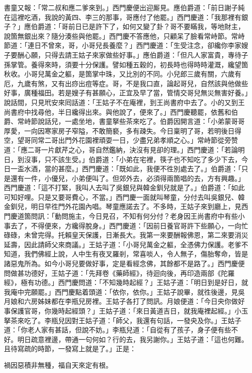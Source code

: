書童又報：「常二叔和應二爹來到。」西門慶便出迎厮見。應伯爵道：「前日謝子純在這裡吃酒，我說的黃四、李三的那事，哥應付了他罷。」西門慶道：「我那裡有銀子？」應伯爵道：「哥前日已是許下了，如何又變了卦？哥不要瞞我，等地財主，說箇無銀出來？隨分湊些與他罷。」西門慶不答應他，只顧呆了臉看常峙節。{}常峙節道：「連日不曾來，哥，小哥兒長養麼？」西門慶道：「生受注念，卻纔你李家嫂子要酬心願，只得去請王姑子來家做些好事。」應伯爵道：「但凡人家富貴，專待子孫掌管。養得來時，須要十分保護。譬如種五穀的，初長時也得時時灌溉，纔望箇秋收。小哥兒萬金之軀，是箇掌中珠，又比別的不同。小兒郎三歲有關，六歲有厄，九歲有煞，又有出痧出痘等症。哥，不是我口直，論起哥兒，自然該與他做些好事，廣種福田。若是嫂子有甚願心，正宜及早了當，管情交哥兒無災無害好養。」說話間，只見玳安來囘話道：「王姑子不在庵裡，到王尚書府中去了。小的又到王尚書府中找尋他，半日纔得出來。與他說了，便來了。」西門慶聽罷，依舊和伯爵、常峙節說話兒，一處坐地，書童拏些茶來吃了。伯爵因開言道：「小弟蒙哥哥厚愛，一向因寒家房子窄隘，不敢簡褻，多有疎失。今日稟明了哥，若明後日得空，望哥同常二哥出門外花園裡頑耍一日，少盡兄弟孝順之心。」常峙節從旁赞道：「應二哥一片獻芹之心，哥自然鑑納，決沒有見卻的理。」西門慶道：「若論明日，到沒事，只不該生受。」伯爵道：「小弟在宅裡，筷子也不知吃了多少下去，{}今日一盃水酒，當的甚麼。」西門慶道：「既如此，我便不徃別處去了。」伯爵道：「只是還有一件，小優兒，小弟便叫了。但郊外去，必須得兩箇唱的去，方有興趣。」西門慶道：「這不打緊，我叫人去叫了吳銀兒與韓金釧兒就是了。」伯爵道：「如此可知好哩。只是又要哥費心，不當。」西門慶一面就叫琴童，分付去叫吳銀兒、韓金釧兒，明日早徃門外花園內唱。琴童應諾去了。不多時，王姑子來到廳上，見西門慶道箇問訊：「動問施主，今日見召，不知有何分付？老身因王尚書府中有些小事去了，不得便來，方纔得脫身。」西門慶道：「因前日養官哥許下些願心，一向忙碌碌，未曾完得。托賴皇天保護，日漸長大。我第一來要酬報佛恩，第二來要消災延壽，因此請師父來商議。」王姑子道：「小哥兒萬金之軀，全憑佛力保護。老爹不知道，我們佛經上說，人中生有夜叉羅剎，常喜啖人，令人無子，傷胎奪命，皆是諸惡鬼所為。{}如今小哥兒要做好事，定是看經念佛，其餘都不是路了。」西門慶便問做甚功德好，王姑子道：「先拜卷《藥師經》，待迴向後，再印造兩部《陀羅經》，極有功德。」西門慶問道：「不知幾時起經？」王姑子道：「明日到是好日，就我庵中完願罷。」西門慶點着頭道：「依你，依你。」王姑子說畢，就徃後邊，見吳月娘和六房姊妹都在李瓶兒房裡。王姑子各打了問訊。月娘便道：「今日央你做好事保護官哥，你幾時起經頭？」王姑子道：「來日黃道吉日，就我庵裡起經。」小玉拏茶來吃了。李瓶兒因對王姑子道：「師父，我還有句話，一發央及你。」王姑子道：「你老人家有甚話，但說不妨。」李瓶兒道：「自從有了孩子，身子便有些不好。明日疏意裡邊，帶通一句何如？行的去，我另謝你。」王姑子道：「這也何難。且待寫疏的時節，一發寫上就是了。」正是：

\begin{myquote}
禍因惡積非無種，福自天來定有根。
\end{myquote}

